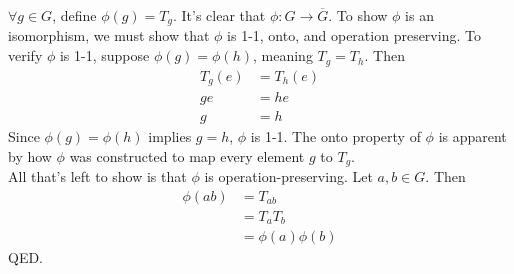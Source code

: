 \documentclass{article}
\begin{document}
$\forall g \in G$, define $\phi(g)=T_g$. It's clear that $\phi \colon G \to \overline{G}$. To show $\phi$ is
an isomorphism, we must show that $\phi$ is 1-1, onto, and operation preserving. To verify $\phi$ is 1-1,
suppose $\phi(g) = \phi(h)$, meaning $T_g = T_h$. Then
\begin{align*}
T_g(e) &= T_h(e) \\
ge &= he \\
g &= h
\end{align*}
Since $\phi(g) = \phi(h)$ implies $g=h$, $\phi$ is 1-1. The onto property of $\phi$ is apparent by how
$\phi$ was constructed to map every element $g$ to $T_g$. \[\] 
All that's left to show is that $\phi$ is 
operation-preserving. Let $a,b \in G$. Then
\begin{align}
\phi(ab) &= T_{ab} \\
&= T_aT_b \\
&= \phi(a)\phi(b)
\end{align}
QED.
\end{document}
